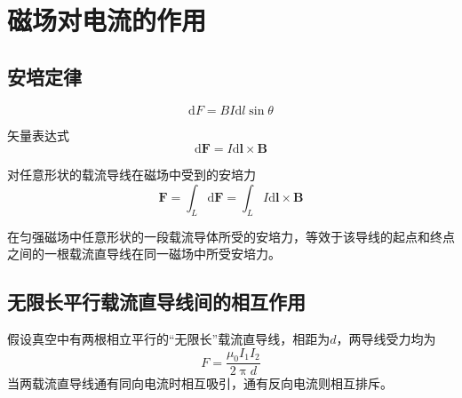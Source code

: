\documentclass[12pt]{article}
\newcommand{\rmd}{\mathrm{d}}
\begin{document}
\section{磁场对电流的作用}

\subsection{安培定律}

\begin{equation}
    \rmd F = B I \rmd l \sin \theta
\end{equation}

矢量表达式
\begin{equation}
    \rmd \boldsymbol{F} = I \rmd \boldsymbol{l} \times \boldsymbol{B}
\end{equation}

对任意形状的载流导线在磁场中受到的安培力
\begin{equation}
    \boldsymbol{F} = \int_L \rmd \boldsymbol{F} = \int_L I \rmd \boldsymbol{l} \times \boldsymbol{B}
\end{equation}

在匀强磁场中任意形状的一段载流导体所受的安培力，等效于该导线的起点和终点之间的一根载流直导线在同一磁场中所受安培力。

\subsection{无限长平行载流直导线间的相互作用}

假设真空中有两根相立平行的“无限长”载流直导线，相距为$d$，两导线受力均为
\begin{equation}
    F = \frac{\mu_0 I_1 I_2}{2 \uppi d}
\end{equation}
当两载流直导线通有同向电流时相互吸引，通有反向电流则相互排斥。
\end{document}

